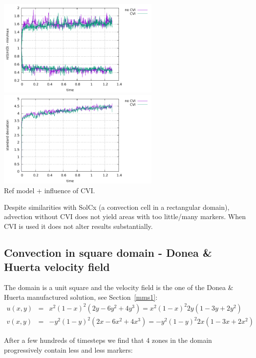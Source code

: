 \begin{center}
\includegraphics[width=8cm]{python_codes/fieldstone_30/results_box/markercount_cvi}
\includegraphics[width=8cm]{python_codes/fieldstone_30/results_box/stdev_cvi}\\
{\captionfont Ref model + influence of CVI.}
\end{center}

Despite similarities with SolCx (a convection cell in a rectangular domain),
advection without CVI does not yield areas with too little/many markers.
When CVI is used it does not alter results substantially.


\newpage
\subsection*{Convection in square domain - Donea \& Huerta velocity field}

The domain is a unit square and the velocity field is the one of the 
Donea \& Huerta manufactured solution, see Section~\ref{mms1}:
\begin{eqnarray}
u(x,y) &=& x^2(1- x)^2 (2y - 6y^2 + 4y^3) = x^2(1-x)^2 2y (1-3y+2y^2) \nonumber\\
v(x,y) &=& -y^2 (1 - y)^2 (2x - 6x^2 + 4x^3) = -y^2 (1 - y)^2 2x (1-3x+2x^2) 
\end{eqnarray}

After a few hundreds of timesteps we find that 4 zones in the domain 
progressively contain less and less markers:

